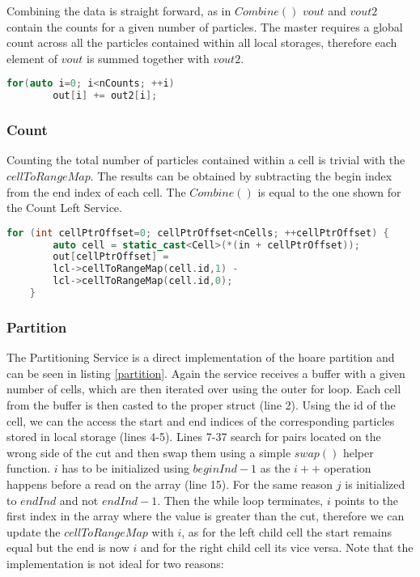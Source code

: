 \documentclass[]{article}
\begin{document}
Combining the data is straight forward, as in $Combine()$ $vout$ and $vout2$ contain the counts for a given number of particles. The master requires a global count across all the particles contained within all local storages, therefore each element of $vout$ is summed together with $vout2$. 

\begin{lstlisting}[language=c++, caption=Part of the Count Left Combine() method, label=ctlc]
	for(auto i=0; i<nCounts; ++i)
		out[i] += out2[i];
\end{lstlisting}

\subsubsection{Count}

Counting the total number of particles contained within a cell is trivial with the $cellToRangeMap$. The results can be obtained by subtracting the begin index from the end index of each cell. The $Combine()$ is equal to the one shown for the Count Left Service.

\begin{lstlisting}[language=c++, caption=Part of Count Service() method]
	for (int cellPtrOffset=0; cellPtrOffset<nCells; ++cellPtrOffset) {
		auto cell = static_cast<Cell>(*(in + cellPtrOffset));
		out[cellPtrOffset] = 
		lcl->cellToRangeMap(cell.id,1) - 
		lcl->cellToRangeMap(cell.id,0);
	}
\end{lstlisting}

\subsubsection{Partition}

The Partitioning Service is a direct implementation of the hoare partition and can be seen in listing \ref{partition}. Again the service receives a buffer with a given number of cells, which are then iterated over using the outer for loop. Each cell from the buffer is then casted to the proper struct (line 2). Using the id of the cell, we can the access the start and end indices of the corresponding particles stored in local storage (lines 4-5). Lines 7-37 search for pairs located on the wrong side of the cut and then swap them using a simple $swap()$ helper function. $i$ has to be initialized using $beginInd -1$ as the $i++$ operation happens before a read on the array (line 15). For the same reason $j$ is initialized to $endInd$ and not $endInd -1$. Then the while loop terminates, $i$ points to the first index in the array where the value is greater than the cut, therefore we can update the $cellToRangeMap$ with $i$, as for the left child cell the start remains equal but the end is now $i$ and for the right child cell its vice versa. 
Note that the implementation is not ideal for two reasons:
\end{document}

